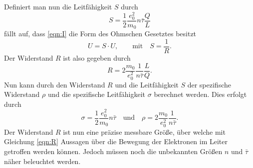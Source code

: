 Definiert man nun die Leitfähigkeit $S$ durch
\begin{equation*}
    S=\frac{1}{2}\frac{e_0^2}{m_0}n\bar{\tau}\frac{Q}{L}
\end{equation*}
fällt auf, dass \eqref{eqn:I} die Form des Ohmschen Gesetztes besitzt
\begin{equation*}
    U=S\cdot U, \qquad \text{mit}\quad S=\frac{1}{R}.
\end{equation*}
Der Widerstand $R$ ist also gegeben durch
\begin{equation}
    R=2\frac{m_0}{e_0^2}\frac{1}{n\bar{\tau}}\frac{L}{Q}. \label{eqn:R}
\end{equation}
Nun kann durch den Widerstand $R$ und die Leitfähigkeit $S$ der spezifische Widerstand $\rho$ und
die spezifische Leitfähigkeit $\sigma$ berechnet werden. Dies erfolgt durch
\begin{equation*}
    \sigma=\frac{1}{2}\frac{e_0^2}{m_0}n\bar{\tau}
    \quad \text{und} \quad
    \rho=2\frac{m_0}{e_0^2}\frac{1}{n\bar{\tau}}.
\end{equation*}
Der Widerstand $R$ ist nun eine präzise messbare Größe, über welche mit Gleichung \ref{eqn:R} Aussagen
über die Bewegung der Elektronen im Leiter getroffen werden können. Jedoch müssen noch die unbekannten
Größen $n$ und $\bar{\tau}$ näher beleuchtet werden.
